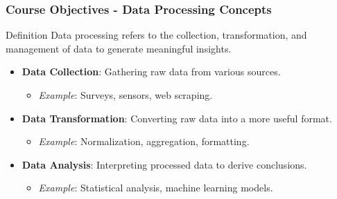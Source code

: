 \documentclass[aspectratio=169]{beamer}
\begin{document}
\begin{frame}[fragile]
    \frametitle{Course Objectives - Data Processing Concepts}
    \begin{block}{Definition}
        Data processing refers to the collection, transformation, and management of data to generate meaningful insights.
    \end{block}
    
    \begin{itemize}
        \item \textbf{Data Collection}: Gathering raw data from various sources.
            \begin{itemize}
                \item \textit{Example}: Surveys, sensors, web scraping.
            \end{itemize}
        \item \textbf{Data Transformation}: Converting raw data into a more useful format.
            \begin{itemize}
                \item \textit{Example}: Normalization, aggregation, formatting.
            \end{itemize}
        \item \textbf{Data Analysis}: Interpreting processed data to derive conclusions.
            \begin{itemize}
                \item \textit{Example}: Statistical analysis, machine learning models.
            \end{itemize}
    \end{itemize}
\end{frame}
\end{document}
